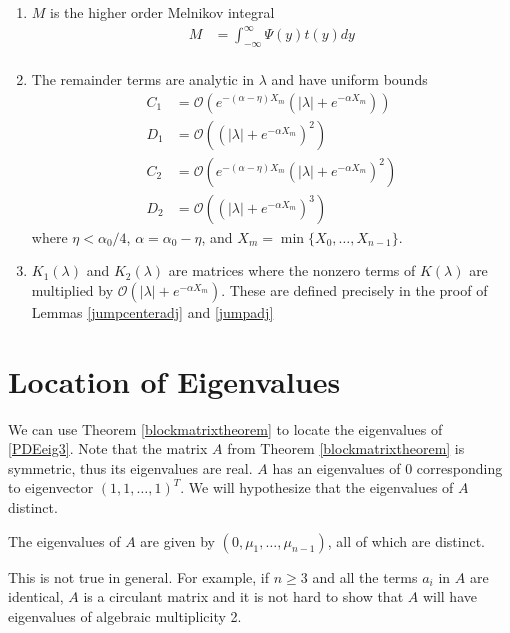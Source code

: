 \documentclass[thesis.tex]{subfiles}
\begin{document}
\begin{theorem}
\begin{enumerate}
\item $M$ is the higher order Melnikov integral
\begin{align*}
M &= \int_{-\infty}^\infty \Psi(y) t(y) dy \\
\end{align*}

\item The remainder terms are analytic in $\lambda$ and have uniform bounds
\begin{align*}
C_1 &= \mathcal{O}(e^{-(\alpha - \eta) X_m}(|\lambda| + e^{-\alpha X_m})) \\
D_1 &= \mathcal{O}((|\lambda| + e^{-\alpha X_m})^2) \\
C_2 &= \mathcal{O}(e^{-(\alpha - \eta) X_m}(|\lambda| + e^{-\alpha X_m})^2) \\
D_2 &= \mathcal{O}((|\lambda| + e^{-\alpha X_m})^3)
\end{align*}
where $\eta < \alpha_0/4$, $\alpha = \alpha_0 - \eta$, and $X_m = \min\{X_0, \dots, X_{n-1}\}$.

\item $K_1(\lambda)$ and $K_2(\lambda)$ are matrices where the nonzero terms of $K(\lambda)$ are multiplied by $\mathcal{O}(|\lambda| + e^{-\alpha X_m})$. These are defined precisely in the proof of Lemmas \ref{jumpcenteradj} and \ref{jumpadj}

\end{enumerate}
\end{theorem}

\section{Location of Eigenvalues}

We can use Theorem \ref{blockmatrixtheorem} to locate the eigenvalues of \eqref{PDEeig3}. Note that the matrix $A$ from Theorem \ref{blockmatrixtheorem} is symmetric, thus its eigenvalues are real. $A$ has an eigenvalues of 0 corresponding to eigenvector $(1, 1, \dots, 1)^T$. We will hypothesize that the eigenvalues of $A$ distinct. 

\begin{hypothesis}\label{Adistincteigs}
The eigenvalues of $A$ are given by $(0, \mu_1, \dots, \mu_{n-1})$, all of which are distinct.
\end{hypothesis}

This is not true in general. For example, if $n \geq 3$ and all the terms $a_i$ in $A$ are identical, $A$ is a circulant matrix and it is not hard to show that $A$ will have eigenvalues of algebraic multiplicity 2.
\end{document}
